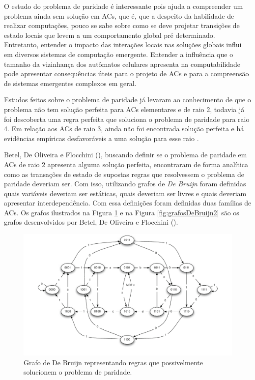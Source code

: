 \documentclass[12pt,a4paper]{article}
\begin{document}
O estudo do problema de paridade é interessante pois ajuda a compreender um problema ainda sem solução em ACs, que é, que a despeito da habilidade de realizar computações, pouco se sabe sobre como se deve projetar transições de estado locais que levem a um comportamento global pré determinado. Entretanto, entender o impacto das interações locais nas soluções globais influi em diversos sistemas de computação emergente. Entender a influência que o tamanho da vizinhança dos autômatos celulares apresenta na computabilidade pode apresentar consequências úteis para o projeto de ACs e para a compreensão de sistemas emergentes complexos em geral.

Estudos feitos sobre o problema de paridade já levaram ao conhecimento de que o problema não tem solução perfeita para ACs elementares e de raio 2, todavia já foi descoberta uma regra perfeita que soluciona o problema de paridade para raio 4. Em relação aos ACs de raio 3, ainda não foi encontrada solução perfeita e há evidências empíricas desfavoráveis a uma solução para esse raio \cite{Betel2013}.

Betel, De Oliveira e Flocchini (\citeyear{Betel2013}), buscando definir se o problema de paridade em ACs de raio 2 apresenta alguma solução perfeita, encontraram de forma analítica como as transações de estado de supostas regras que resolvessem o problema de paridade deveriam ser. Com isso, utilizando grafos de \textit{De Bruijn} foram definidas quais variáveis deveriam ser estáticas, quais deveriam ser livres e quais deveriam apresentar interdependência. Com essa definições foram definidas duas famílias de ACs. Os grafos ilustrados na Figura \ref{fig:grafosDeBruijn} e na Figura \ref{fig:grafosDeBruijn2} são os grafos desenvolvidos por Betel, De Oliveira e Flocchini (\citeyear{Betel2013}).

\begin{figure}[h!]
  \centering
  \includegraphics[width=.8\textwidth]{grafo1.pdf}
    \caption{Grafo de De Bruijn representando regras que possivelmente solucionem o problema de paridade.}
    \label{fig:grafosDeBruijn}
\end{figure}
\end{document}

